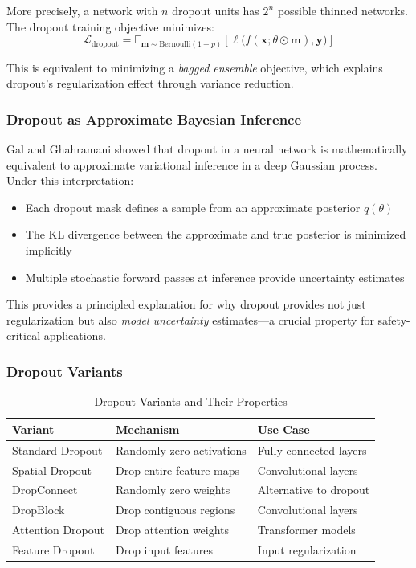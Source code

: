 More precisely, a network with $n$ dropout units has $2^n$ possible thinned networks. The dropout training objective minimizes:
\begin{equation}
\mathcal{L}_{\text{dropout}} = \mathbb{E}_{\mathbf{m} \sim \text{Bernoulli}(1-p)} \left[\ell\bigl(f(\mathbf{x}; \theta \odot \mathbf{m}), \mathbf{y}\bigr)\right]
\end{equation}

This is equivalent to minimizing a \emph{bagged ensemble} objective, which explains dropout's regularization effect through variance reduction.

\subsubsection{Dropout as Approximate Bayesian Inference}

Gal and Ghahramani \cite{gal2016dropout} showed that dropout in a neural network is mathematically equivalent to approximate variational inference in a deep Gaussian process. Under this interpretation:
\begin{itemize}
    \item Each dropout mask defines a sample from an approximate posterior $q(\theta)$
    \item The KL divergence between the approximate and true posterior is minimized implicitly
    \item Multiple stochastic forward passes at inference provide uncertainty estimates
\end{itemize}

This provides a principled explanation for why dropout provides not just regularization but also \emph{model uncertainty} estimates---a crucial property for safety-critical applications.

\subsubsection{Dropout Variants}

\begin{table}[ht]
    \centering
    \caption{Dropout Variants and Their Properties}
    \begin{tabular}{L{3cm} L{4cm} L{4cm}}
        \toprule
        \textbf{Variant} & \textbf{Mechanism} & \textbf{Use Case} \\
        \midrule
        Standard Dropout & Randomly zero activations & Fully connected layers \\
        Spatial Dropout & Drop entire feature maps & Convolutional layers \\
        DropConnect & Randomly zero weights & Alternative to dropout \\
        DropBlock & Drop contiguous regions & Convolutional layers \\
        Attention Dropout & Drop attention weights & Transformer models \\
        Feature Dropout & Drop input features & Input regularization \\
        \bottomrule
    \end{tabular}
\end{table}

